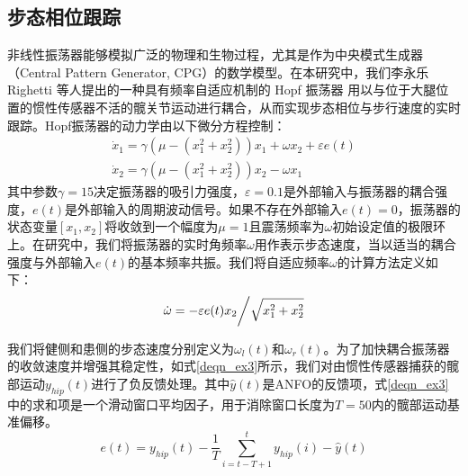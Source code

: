 \subsection{步态相位跟踪} 
非线性振荡器能够模拟广泛的物理和生物过程，尤其是作为中央模式生成器（Central Pattern Generator, CPG）的数学模型。在本研究中，我们李永乐Righetti 等人提出的一种具有频率自适应机制的 Hopf 振荡器 \cite{righettiDynamicHebbianLearning2006a}用以与位于大腿位置的惯性传感器不活的髋关节运动进行耦合，从而实现步态相位与步行速度的实时跟踪。Hopf振荡器的动力学由以下微分方程控制：
\begin{equation}
\label{deqn_ex1}
\begin{array}{*{20}{l}}
{{{\dot x}_1} = \gamma \left( {\mu  - \left( {x_1^2 + x_2^2} \right)} \right){x_1} + \omega {x_2} + \varepsilon e(t)}  \\  
{{{\dot x}_2} = \gamma \left( {\mu  - \left( {x_1^2 + x_2^2} \right)} \right){x_2} - \omega {x_1}} 
\end{array}
\end{equation}   
其中参数$\gamma= 15$决定振荡器的吸引力强度，$\varepsilon  = 0.1$是外部输入与振荡器的耦合强度，$e(t)$是外部输入的周期波动信号。如果不存在外部输入$e(t)=0$，振荡器的状态变量$[{x_1},{x_2}]$将收敛到一个幅度为$\mu=1$且震荡频率为$\omega$初始设定值的极限环上。在研究中，我们将振荡器的实时角频率$\omega$用作表示步态速度，当以适当的耦合强度与外部输入$e(t)$的基本频率共振。我们将自适应频率$\omega$的计算方法定义如下：
\begin{equation}
\label{deqn_ex2}
\dot \omega  = {{ - \varepsilon e(t){x_2}} \mathord{\left/
{\vphantom {{ - \varepsilon e(t){x_2}} {\sqrt {x_1^2 + x_2^2} }}} \right.
\kern-\nulldelimiterspace} {\sqrt {x_1^2 + x_2^2} }}
\end{equation}    

我们将健侧和患侧的步态速度分别定义为${\omega _l}(t)$和${\omega _r}(t)$。为了加快耦合振荡器的收敛速度并增强其稳定性，如式\ref{deqn_ex3}所示，我们对由惯性传感器捕获的髋部运动${y_{hip}}(t)$进行了负反馈处理。其中$\hat y(t)$是ANFO的反馈项，式\ref{deqn_ex3}中的求和项是一个滑动窗口平均因子，用于消除窗口长度为$T = 50$内的髋部运动基准偏移。
\begin{equation}
\label{deqn_ex3}
e(t) = {y_{hip}}(t) - \frac{1}{T}\sum\limits_{i = t - T + 1}^t {{y_{hip}}(i)}  - \hat y(t)
\end{equation}   

